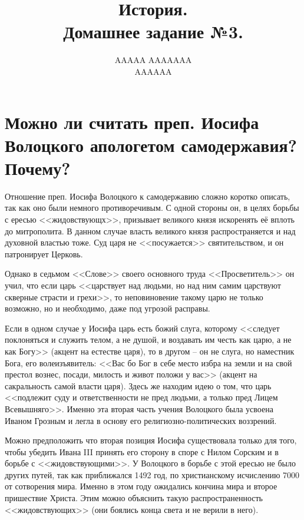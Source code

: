 \documentclass[12pt]{article}
\title{История. \\ Домашнее задание №3.}
\author{AAAAA AAAAAAA \\ AAAAAA}
\begin{document}
  \maketitle
  \setcounter{section}{2}

  \section{Можно ли считать преп. Иосифа Волоцкого апологетом\protect\footnotemark{} самодержавия\protect\footnotemark{}? Почему?}
  \addtocounter{footnote}{-2}

  Отношение преп. Иосифа Волоцкого к самодержавию сложно коротко описать, так как оно были немного противоречивым.
  С одной стороны он, в целях борьбы с ересью <<жидовствующх>>, призывает великого князя искоренять её вплоть до митрополита.
  В данном случае власть великого князя распространяется и над духовной властью тоже.
  Суд царя не <<посужается>> святительством, и он патронирует Церковь.

  Однако в седьмом <<Слове>> своего основного труда <<Просветитель>> он учил,
  что если царь <<царствует над людьми, но над ним самим царствуют скверные страсти и грехи>>,
  то неповиновение такому царю не только возможно, но и необходимо, даже под угрозой расправы.

  Если в одном случае у Иосифа царь есть божий слуга,
  которому <<следует поклоняться и служить телом, а не душой, и воздавать им честь как царю, а не как Богу>> (акцент на естестве царя),
  то в другом -- он не слуга, но наместник Бога, его волеизъявитель:
  <<Вас бо Бог в себе место избра на земли и на свой престол вознес, посади, милость и живот положи у вас>>
  (акцент на сакральность самой власти царя).
  Здесь же находим идею о том, что царь <<подлежит суду и ответственности не пред людьми, а только пред Лицем Всевышняго>>.
  Именно эта вторая часть учения Волоцкого была усвоена Иваном Грозным и легла в основу его религиозно-политических воззрений.

  Можно предположить что вторая позиция Иосифа существовала только для того,
  чтобы убедить Ивана III принять его сторону в споре с Нилом Сорским и в борьбе с <<жидовствующими>>.
  У Волоцкого в борьбе с этой ересью не было других путей, так как приближался 1492 год, по христианскому исчислению 7000 от сотворения мира.
  Именно в этом году ожидались кончина мира и второе пришествие Христа.
  Этим можно объяснить такую распространенность <<жидовствующих>> (они боялись конца света и не верили в него).
\end{document}

